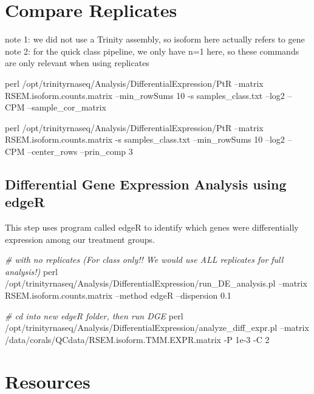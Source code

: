 \documentclass[]{article}
\newenvironment{Shaded}{\begin{snugshade}}{\end{snugshade}}
\newcommand{\CommentTok}[1]{\textcolor[rgb]{0.56,0.35,0.01}{\textit{#1}}}
\newcommand{\FunctionTok}[1]{\textcolor[rgb]{0.00,0.00,0.00}{#1}}
\newcommand{\NormalTok}[1]{#1}
\begin{document}
\hypertarget{compare-replicates}{%
\section{Compare Replicates}\label{compare-replicates}}

note 1: we did not use a Trinity assembly, so isoform here actually
refers to gene note 2: for the quick class pipeline, we only have n=1
here, so these commands are only relevant when using replicates

\begin{Shaded}
\begin{Highlighting}[]
\FunctionTok{perl}\NormalTok{ /opt/trinityrnaseq/Analysis/DifferentialExpression/PtR --matrix RSEM.isoform.counts.matrix --min_rowSums 10 -s samples_class.txt --log2 --CPM --sample_cor_matrix}

\FunctionTok{perl}\NormalTok{ /opt/trinityrnaseq/Analysis/DifferentialExpression/PtR --matrix RSEM.isoform.counts.matrix -s samples_class.txt --min_rowSums 10 --log2 --CPM --center_rows --prin_comp 3 }
\end{Highlighting}
\end{Shaded}

\hypertarget{differential-gene-expression-analysis-using-edger}{%
\subsection{Differential Gene Expression Analysis using
edgeR}\label{differential-gene-expression-analysis-using-edger}}

This step uses program called edgeR to identify which genes were
differentially expression among our treatment groups.

\begin{Shaded}
\begin{Highlighting}[]
\CommentTok{# with no replicates (For class only!! We would use ALL replicates for full analysis!)}
\FunctionTok{perl}\NormalTok{ /opt/trinityrnaseq/Analysis/DifferentialExpression/run_DE_analysis.pl --matrix RSEM.isoform.counts.matrix --method edgeR --dispersion 0.1}

\CommentTok{# cd into new edgeR folder, then run DGE}
\FunctionTok{perl}\NormalTok{ /opt/trinityrnaseq/Analysis/DifferentialExpression/analyze_diff_expr.pl --matrix /data/corals/QCdata/RSEM.isoform.TMM.EXPR.matrix -P 1e-3 -C 2}
\end{Highlighting}
\end{Shaded}

\hypertarget{resources}{%
\section{Resources}\label{resources}}
\end{document}
